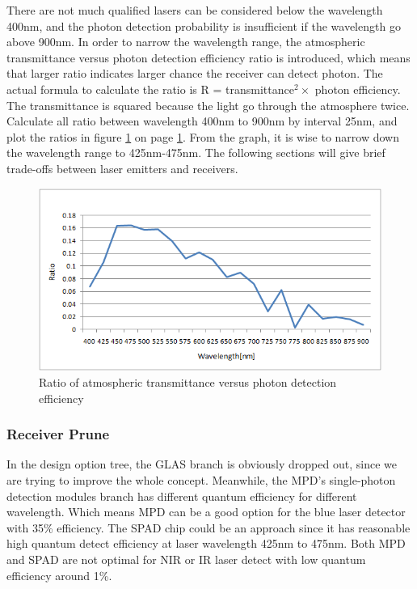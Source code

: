 There are not much qualified \acs{laser}s can be considered below the wavelength 400nm, and the photon detection probability is insufficient if the wavelength go above 900nm. In order to narrow the wavelength range, the atmospheric transmittance versus photon detection efficiency ratio is introduced, which means that larger ratio indicates larger chance the receiver can detect photon. The actual formula to calculate the ratio is R = transmittance$^{2} \times$ photon efficiency. The transmittance is squared because the light go through the atmosphere twice. Calculate all ratio between wavelength 400nm to 900nm by interval 25nm, and plot the ratios in figure \ref{fig:wavelength_estimation} on page \ref{fig:wavelength_estimation}. From the graph, it is wise to narrow down the wavelength range to 425nm-475nm.  The following sections will give brief trade-offs between \acs{laser} emitters and receivers.

\begin{figure}
\centering
\includegraphics[scale=1]{chapters/img/wavelength_estimation.png}
\caption{Ratio of atmospheric transmittance versus photon detection efficiency}
\label{fig:wavelength_estimation}
\end{figure}


\subsubsection{Receiver Prune}
\label{TOReceiverP}
In the design option tree, the GLAS branch is obviously dropped out, since we are trying to improve the whole concept. Meanwhile, the \ac{MPD}'s single-photon detection modules branch has different quantum efficiency for different wavelength. Which means MPD can be a good option for the blue laser detector with 35\% efficiency. The \ac{SPAD} chip could be an approach since it has reasonable high quantum detect efficiency at laser wavelength 425nm to 475nm. Both \acs{MPD} and \acs{SPAD} are not optimal for \acs{NIR} or \acs{IR} laser detect with low quantum efficiency around 1\%. 

